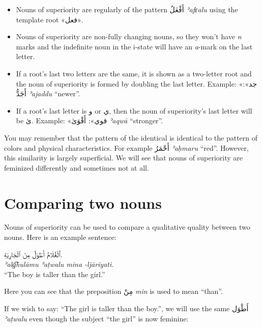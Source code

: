\documentclass[
  10pt,
]{book}
\providecommand{\tightlist}{%
  \setlength{\itemsep}{0pt}\setlength{\parskip}{0pt}}
\begin{document}
\begin{itemize}
\tightlist
\item
  Nouns of superiority are regularly of the pattern \foreignlanguage{arabic}{أَفْعَلُ} \emph{ʾafɛalu} using the template root \foreignlanguage{arabic}{«فعل»}.
\item
  Nouns of superiority are non-fully changing nouns, so they won't have \emph{n} marks and the indefinite noun in the i-state will have an \emph{a}-mark on the last letter.
\item
  If a root's last two letters are the same, it is shown as a two-letter root and the noun of superiority is formed by doubling the last letter. Example: \foreignlanguage{arabic}{«جد»}: \foreignlanguage{arabic}{أَجَدُّ} \emph{ʾajaddu} \enquote{newer}.
\item
  If a root's last letter is \foreignlanguage{arabic}{و} or \foreignlanguage{arabic}{ي}, then the noun of superiority's last letter will be \foreignlanguage{arabic}{ىٰ}. Example: \foreignlanguage{arabic}{«قوي»}: \foreignlanguage{arabic}{أَقْوَىٰ} \emph{ʾaqwā} \enquote{stronger}.
\end{itemize}

You may remember that the pattern of the identical is identical to the pattern of colors and physical characteristics. For example \foreignlanguage{arabic}{أَحْمَرُ} \emph{ʾaḥmaru} \enquote{red}. However, this similarity is largely superficial. We will see that nouns of superiority are feminized differently and sometimes not at all.

\section{Comparing two nouns}\label{comparing-two-nouns}

Nouns of superiority can be used to compare a qualitative quality between two nouns. Here is an example sentence:

\foreignlanguage{arabic}{ٱَلْغُلَامُ أَطْوَلُ مِنَ ٱلْجَارِيَةِ.}\\
\emph{ʾalg͡hulāmu ʾaṭwalu mina -ljāriyati.}\\
\enquote{The boy is taller than the girl.}

Here you can see that the preposition \foreignlanguage{arabic}{مِنْ} \emph{min} is used to mean \enquote{than}.

If we wish to say: \enquote{The girl is taller than the boy.}, we will use the same \foreignlanguage{arabic}{أَطْوَل} \emph{ʾaṭwalu} even though the subject \enquote{the girl} is now feminine:
\end{document}
